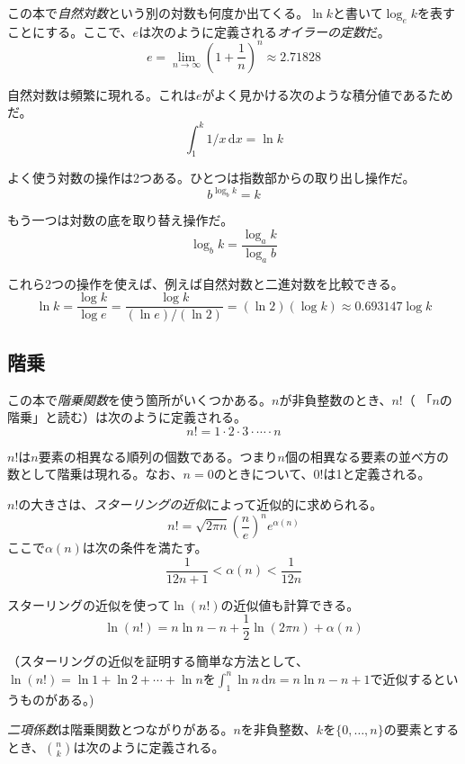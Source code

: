 %
%
この本で\emph{自然対数}という別の対数も何度か出てくる。$\ln k$と書いて$\log_e k$を表すことにする。ここで、$e$は次のように定義される\emph{オイラーの定数}だ。
%
%
\[
   e = \lim_{n\rightarrow\infty} \left(1+\frac{1}{n}\right)^n
   \approx  2.71828
\]

自然対数は頻繁に現れる。これは$e$がよく見かける次のような積分値であるためだ。
\[
    \int_{1}^{k} 1/x\,\mathrm{d}x  = \ln k
\]

よく使う対数の操作は2つある。ひとつは指数部からの取り出し操作だ。
\[
    b^{\log_b k} = k
\]

もう一つは対数の底を取り替え操作だ。
\[
    \log_b k = \frac{\log_a k}{\log_a b}
\]

これら2つの操作を使えば、例えば自然対数と二進対数を比較できる。
\[
   \ln k = \frac{\log k}{\log e} = \frac{\log k}{(\ln e)/(\ln 2)} =
    (\ln 2)(\log k) \approx 0.693147\log k
\]

\subsection{階乗}

この本で\emph{階乗関数}を使う箇所がいくつかある。$n$が非負整数のとき、$n!$（ 「$n$の階乗」と読む）は次のように定義される。
\[
   n! = 1\cdot2\cdot3\cdot\cdots\cdot n
\]

$n!$は$n$要素の相異なる順列の個数である。つまり$n$個の相異なる要素の並べ方の数として階乗は現れる。なお、$n=0$のときについて、$0!$は1と定義される。

%
$n!$の大きさは、\emph{スターリングの近似}によって近似的に求められる。
\[
	n!
   = \sqrt{2\pi n}\left(\frac{n}{e}\right)^{n}e^{\alpha(n)}
\]
ここで$\alpha(n)$は次の条件を満たす。
\[
   \frac{1}{12n+1} <  \alpha(n) < \frac{1}{12n}
\]

スターリングの近似を使って$\ln(n!)$の近似値も計算できる。
\[
   \ln(n!) = n\ln n - n + \frac{1}{2}\ln(2\pi n) + \alpha(n)
\]

（スターリングの近似を証明する簡単な方法として、$\ln(n!)=\ln 1 + \ln 2  + \cdots + \ln n$を$\int_1^n \ln n\,\mathrm{d}n = n\ln n - n +1$で近似するというものがある。)

%
\emph{二項係数}は階乗関数とつながりがある。$n$を非負整数、$k$を$\{0,\ldots,n\}$の要素とするとき、$\binom{n}{k}$は次のように定義される。

